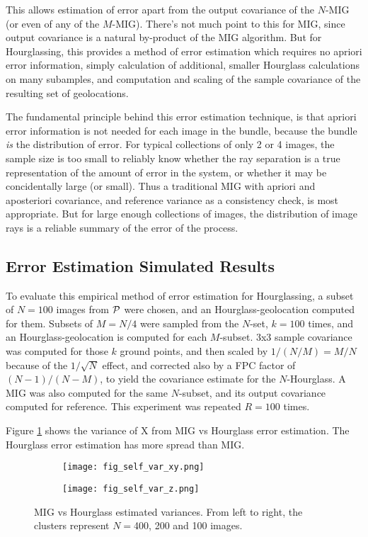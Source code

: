 \documentclass[10pt]{amsart}
\begin{document}
This allows estimation of error apart from the output covariance of the $N$-MIG
(or even of any of the $M$-MIG). There's not much point to this for MIG, since
output covariance is a natural by-product of the MIG algorithm. But for
Hourglassing, this provides a method of error estimation which requires no
apriori error information, simply calculation of additional, smaller Hourglass
calculations on many subamples, and computation and scaling of the sample
covariance of the resulting set of geolocations.

The fundamental principle behind this error estimation technique, is that
apriori error information is not needed for each image in the bundle, because
the bundle {\em is} the distribution of error. For typical collections of only 2
or 4 images, the sample size is too small to reliably know whether the ray
separation is a true representation of the amount of error in the system, or
whether it may be concidentally large (or small). Thus a traditional MIG with
apriori and aposteriori covariance, and reference variance as a consistency
check, is most appropriate. But for large enough collections of images, the
distribution of image rays is a reliable summary of the error of the process.

\subsection{\label{hsimulation}Error Estimation Simulated Results}
To evaluate this empirical method of error estimation for Hourglassing, a subset
of $N=100$ images from $\mathcal{P}$ were chosen, and an Hourglass-geolocation
computed for them. Subsets of $M=N/4$ were sampled from the $N$-set, $k=100$
times, and an Hourglass-geolocation is computed for each $M$-subset. 3x3 sample
covariance was computed for those $k$ ground points, and then scaled by
$1/(N/M)=M/N$ because of the $1/\sqrt{N}$ effect, and corrected also by a FPC
factor of $(N-1)/(N-M)$, to yield the covariance estimate for the
$N$-Hourglass. A MIG was also computed for the same $N$-subset, and its output
covariance computed for reference. This experiment was repeated $R=100$ times.

Figure \ref{fig:mig_vs_hourglass_var} shows the variance of X from MIG vs
Hourglass error estimation. The Hourglass error estimation has more spread than MIG.

\begin{figure}
\centering
\begin{subfigure}{.5\textwidth}
  \centering
  \texttt{[image: fig\_self\_var\_xy.png]}
\end{subfigure}%
\begin{subfigure}{.5\textwidth}
  \centering
  \texttt{[image: fig\_self\_var\_z.png]}
\end{subfigure}
\caption{\label{fig:mig_vs_hourglass_var}MIG vs Hourglass estimated
  variances. From left to right, the clusters represent $N=$400, 200 and 100
  images.}
\end{figure}
\end{document}
